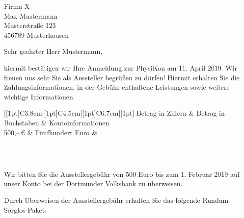 \documentclass[
  pepbrief,
  fontsize=12pt,
  paper=a4,
  DIV=14,
  parskip=half,
  backaddress=false,
]{scrlttr2}
\author{Lena Linhoff}
\begin{document}
\begin{letter}{%
  Firma X\\
  Max Mustermann\\
  Musterstraße 123\\
  456789 Musterhausen

}
\opening{Sehr geehrter Herr Mustermann,}
hiermit bestätigen wir Ihre Anmeldung zur PhysiKon am 11. April 2019. Wir freuen uns sehr Sie als Aussteller begrüßen zu dürfen!
Hiermit erhalten Sie die Zahlungsinformationen, in der Gebühr enthaltene Leistungen sowie weitere wichtige Informationen.

\renewcommand{\arraystretch}{1.2}
\begin{center}
  \bfseries\scshape
	\begin{tabu}{|[1pt]C{3.8cm}|[1pt]C{4.5cm}|[1pt]C{6.7cm}|[1pt]}
		\tabucline[1pt]{-}
		 Betrag in Ziffern	&	Betrag in Buchstaben & Kontoinformationen\\
		\tabucline[1pt]{-}
    500,–\,€ & \normalfont Fünfhundert Euro & \normalfont \begin{tabular}{@{}c@{}}\end{tabular}\\
		\tabucline[1pt]{-}
	\end{tabu}
\end{center}
Wir bitten Sie die Ausstellergebühr von 500 Euro bis zum 1. Februar 2019 auf unser Konto bei der Dortmunder Volksbank zu überweisen.

Durch Überweisen der Ausstellergebühr erhalten Sie das folgende Rundum-Sorglos-Paket:


\end{letter}
\end{document}
